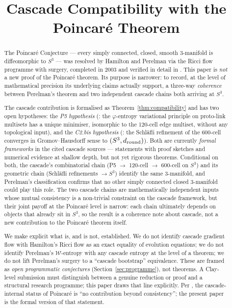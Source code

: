 \documentclass[11pt, a4paper]{amsart}
\title{Cascade Compatibility with the Poincar\'{e} Theorem}
\author{}
\date{}
\theoremstyle{definition}
\begin{document}
\maketitle

\begin{abstract}
The Poincar\'{e} Conjecture --- every simply connected, closed,
smooth $3$-manifold is diffeomorphic to $S^{3}$ --- was resolved
by Hamilton and Perelman \cite{Hamilton1982,Perelman1,Perelman2,
Perelman3} via the Ricci flow programme with surgery, completed in
2003 and verified in detail in \cite{KleinerLott,MorganTian,CaoZhu}.
This paper is \emph{not} a new proof of the Poincar\'{e} theorem.
Its purpose is narrower: to record, at the level of mathematical
precision its underlying claims actually support, a three-way
\emph{coherence} between Perelman's theorem and two independent
cascade chains both arriving at $S^{3}$.

The cascade contribution is formalised as
Theorem~\ref{thm:compatibility} and has two open hypotheses:
the \emph{P5 hypothesis} (\cite[\S P5]{CascadePregeometry}: the
$\varphi$-entropy variational principle on proto-link multisets has
a unique minimiser, isomorphic to the 120-cell edge multiset,
without any topological input), and the \emph{C2.bis hypothesis}
(\cite[\S C2.bis]{CascadeGR}: the Schl\"{a}fli refinement of the
600-cell converges in Gromov--Hausdorff sense to $(S^{3},
d_{\rm round})$). Both are currently \emph{formal frameworks} in
the cited cascade sources --- statements with proof sketches and
numerical evidence at shallow depth, but not yet rigorous
theorems. Conditional on both, the cascade's combinatorial chain
(P5 $\to$ 120-cell $\to$ 600-cell on $S^{3}$) and its geometric
chain (Schl\"{a}fli refinements $\to S^{3}$) identify the same
$3$-manifold, and Perelman's classification confirms that no
other simply connected closed $3$-manifold could play this role.
The two cascade chains are mathematically independent inputs whose
mutual consistency is a non-trivial constraint on the cascade
framework, but their joint payoff at the Poincar\'{e} level is
narrow: each chain ultimately depends on objects that already
sit in $S^{3}$, so the result is a coherence note about cascade,
not a new contribution to the Poincar\'{e} theorem itself.

We make explicit what is, and is not, established. We do not
identify cascade gradient flow with Hamilton's Ricci flow as an
exact equality of evolution equations; we do not identify
Perelman's $\mathcal{W}$-entropy with any cascade entropy at the
level of a theorem; we do not lift Perelman's surgery to a
``cascade bootstrap'' equivalence. These are framed as
\emph{open programmatic conjectures} (Section~\ref{sec:programme}),
not theorems. A Clay-level submission must distinguish between a
genuine reduction or proof and a structural research programme;
this paper draws that line explicitly. Per
\cite[\S MP6.3]{CascadeMillennium}, the cascade-internal status of
Poincar\'{e} is ``no contribution beyond consistency''; the
present paper is the formal version of that statement.
\end{abstract}
\end{document}
